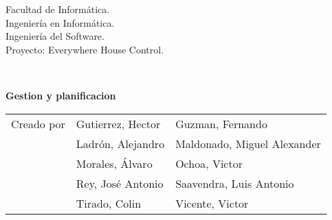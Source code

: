 \begin{titlepage}
    \begin{scriptsize}\noindent Facultad de Informática.\\
        Ingeniería en Informática.\\
        Ingeniería del Software.\\
        Proyecto: Everywhere House Control.
    \end{scriptsize}\\
    \vfill
    \begin{center}
        \begin{Large}
            \textbf{Gestion y planificacion}
        \end{Large}
    \end{center}
    \vfill
    \begin{flushright}
        \begin{scriptsize}
            \begin{tabular}{lll}
                Creado por & Gutierrez, Hector & Guzman, Fernando\\
                & Ladrón, Alejandro & Maldonado, Miguel Alexander\\
                & Morales, Álvaro & Ochoa, Victor\\
                & Rey, José Antonio & Saavendra, Luis Antonio\\
                & Tirado, Colin & Vicente, Victor\\
            \end{tabular}
        \end{scriptsize}
    \end{flushright}
\end{titlepage}
\thispagestyle{empty}
\cleardoublepage
\newpage

\tableofcontents
\newpage
\thispagestyle{empty}
\cleardoublepage
\newpage
{}
\raggedbottom
{}

    
    
    
    
    
    
    

